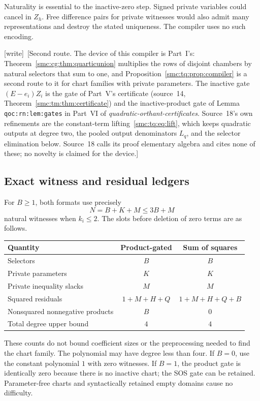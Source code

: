 \documentclass[11pt,letterpaper]{article}
\numberwithin{equation}{section}
\theoremstyle{definition}
\theoremstyle{remark}
\newcommand{\wtag}{\textup{[write]}}
\begin{document}
Naturality is essential to the inactive-zero step. Signed private variables
could cancel in $Z_h$. Free difference pairs for private witnesses would
also admit many representations and destroy the stated uniqueness. The
compiler uses no such encoding.

\wtag\ [Second route. The device of this compiler is Part~I's: Theorem~\ref{smc:cg:thm:quarticunion} multiplies the rows of disjoint chambers by natural selectors that sum to one, and Proposition~\ref{smc:tq:prop:compiler} is a second route to it for chart families with private parameters. The inactive gate $(E-e_i)Z_i$ is the gate of Part~V's certificate (source~14, Theorem~\ref{smc:tm:thm:certificate}) and the inactive-product gate of Lemma \texttt{qoc:rn:lem:gates} in Part~VI of \emph{quadratic-orthant-certificates}. Source~18's own refinements are the constant-term lifting~\eqref{smc:tq:eq:lift}, which keeps quadratic outputs at degree two, the pooled output denominators $L_q$, and the selector elimination below. Source~18 calls its proof elementary algebra and cites none of these; no novelty is claimed for the device.]

\subsection{Exact witness and residual ledgers}
For $B\ge1$, both formats use precisely
\begin{equation}\label{smc:tq:eq:ledger}
 N=B+K+M\le3B+M
\end{equation}
natural witnesses when $k_i\le2$. The slots before deletion of zero terms
are as follows.
\begin{center}
\begin{tabular}{lcc}
\toprule
Quantity & Product-gated & Sum of squares\\
\midrule
Selectors & $B$ & $B$\\
Private parameters & $K$ & $K$\\
Private inequality slacks & $M$ & $M$\\
Squared residuals & $1+M+H+Q$ & $1+M+H+Q+B$\\
Nonsquared nonnegative products & $B$ & $0$\\
Total degree upper bound & $4$ & $4$\\
\bottomrule
\end{tabular}
\end{center}
These counts do not bound coefficient sizes or the preprocessing needed to
find the chart family. The polynomial may have degree less than four.
If $B=0$, use the constant polynomial $1$ with zero witnesses. If $B=1$,
the product gate is identically zero because there is no inactive chart;
the SOS gate can be retained. Parameter-free charts and syntactically
retained empty domains cause no difficulty.
\end{document}
